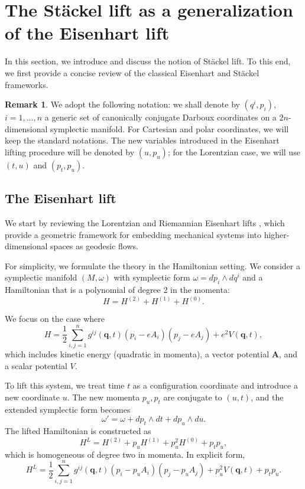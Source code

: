 \documentclass[10pt]{amsart}
\numberwithin{equation}{section}
\newcommand{\bs}{\boldsymbol}
\theoremstyle{definition}
\newtheorem{remark}{\textbf{Remark}}
\begin{document}
	\section{The St\"ackel lift as a generalization of the Eisenhart lift} \label{sec:3}

In this section, we introduce and discuss the notion of St\"ackel lift. To this end, we first provide a concise review of the classical Eisenhart and Stäckel frameworks.


	\begin{remark}
		We adopt the following notation: we shall denote by $(q^{i}, p_i)$,  $i=1,\ldots,n$ a generic set of canonically conjugate Darboux coordinates on a $2n$-dimensional symplectic manifold. For Cartesian and polar coordinates, we will keep the standard notations. The new variables introduced in the Eisenhart lifting procedure will be denoted by $(u, p_u)$; for the Lorentzian case, we will use $(t,u)$ and $(p_t, p_u)$.
	\end{remark}
	
	\subsection{The Eisenhart lift} \label{sec:3.1}

	We start by reviewing the Lorentzian and Riemannian Eisenhart lifts \cite{E1928AM,DBKP1985PRD,DGH1991PRD,CKA2015EJP}, which provide a geometric framework for embedding mechanical systems into higher-dimensional spaces as geodesic flows.

	For simplicity, we formulate the theory in the Hamiltonian setting. We consider a symplectic manifold $(M, \omega)$ with symplectic form $\omega= dp_i\wedge dq^{i}$ and a Hamiltonian that is a polynomial of degree 2 in the momenta:
	\begin{equation}
		H= H^{(2)}+H^{(1)}+H^{(0)}.
	\end{equation}

	We focus on the case where
	\begin{equation} \label{eq:3.1}
		H= \frac{1}{2}\sum_{i,j=1}^{n} g^{ij}(\bs{q},t) (p_i -e A_i)(p_j-e A_j) + e^2 V(\bs{q},t),
	\end{equation}
	which includes kinetic energy (quadratic in momenta), a vector potential $\bs{A}$, and a scalar potential $V$.

	To lift this system, we treat time $t$ as a configuration coordinate and introduce a new coordinate $u$. The new momenta $p_u, p_t$ are conjugate to $(u,t)$, and the extended symplectic form becomes
	\begin{equation}
		\omega'=\omega+ dp_t \wedge  dt + dp_u \wedge du.
	\end{equation}
	The lifted Hamiltonian is constructed as
	\begin{equation}
		H^{L}= H^{(2)}+p_u H^{(1)}+ p_u^2 H^{(0)}+ p_t p_u,
	\end{equation}
	which is homogeneous of degree two in momenta. In explicit form,
	\begin{equation} \label{eq:Lor lift}
		H^L= \frac{1}{2}\sum_{i,j=1}^{n} g^{ij}(\bs{q},t) (p_i -p_u A_i)(p_j- p_u A_j) + p_u^2 V(\bs{q},t)+ p_t p_u.
	\end{equation}
\end{document}

